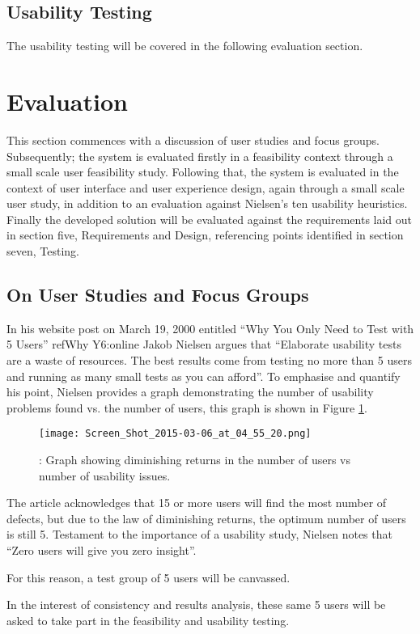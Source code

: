\documentclass[a4paper]{article}
\begin{document}
\subsection{Usability Testing}
The usability testing will be covered in the following evaluation section.

\section{Evaluation}
This section commences with a discussion of user studies and focus groups. Subsequently; the system is evaluated firstly in a feasibility context through a small scale user feasibility study. Following that, the system is evaluated in the context of user interface and user experience design, again through a small scale user study, in addition to an evaluation against Nielsen's ten usability heuristics. Finally the developed solution will be evaluated against the requirements laid out in section five, Requirements and Design, referencing points identified in section seven, Testing.

\subsection{On User Studies and Focus Groups}
In his website post on March 19, 2000 entitled ``Why You Only Need to Test with 5 Users'' ref{Why Y6:online} Jakob
Nielsen argues that ``Elaborate usability tests are a waste of resources. The best results come from
testing no more than 5 users and running as many small tests as you can afford''. To emphasise and quantify his point, Nielsen provides a graph demonstrating the number of usability problems found vs. the number of users, this graph is shown in Figure \ref{fig:neilsonGraph}.
\begin{figure}[H]
  \centering
    \texttt{[image: Screen\_Shot\_2015-03-06\_at\_04\_55\_20.png]}
     \caption{: Graph showing diminishing returns in the number of users vs number of usability issues.}
      \label{fig:neilsonGraph}
\end{figure}
The article acknowledges that 15 or more users will find the most number of defects, but due to the
law of diminishing returns, the optimum number of users is still 5. Testament to the importance of a
usability study, Nielsen notes that ``Zero users will give you zero insight''. 

For this reason, a test group of 5 users will be canvassed.

In the interest of consistency and results analysis, these same 5 users will be asked to take part in the feasibility and usability testing.
\end{document}
